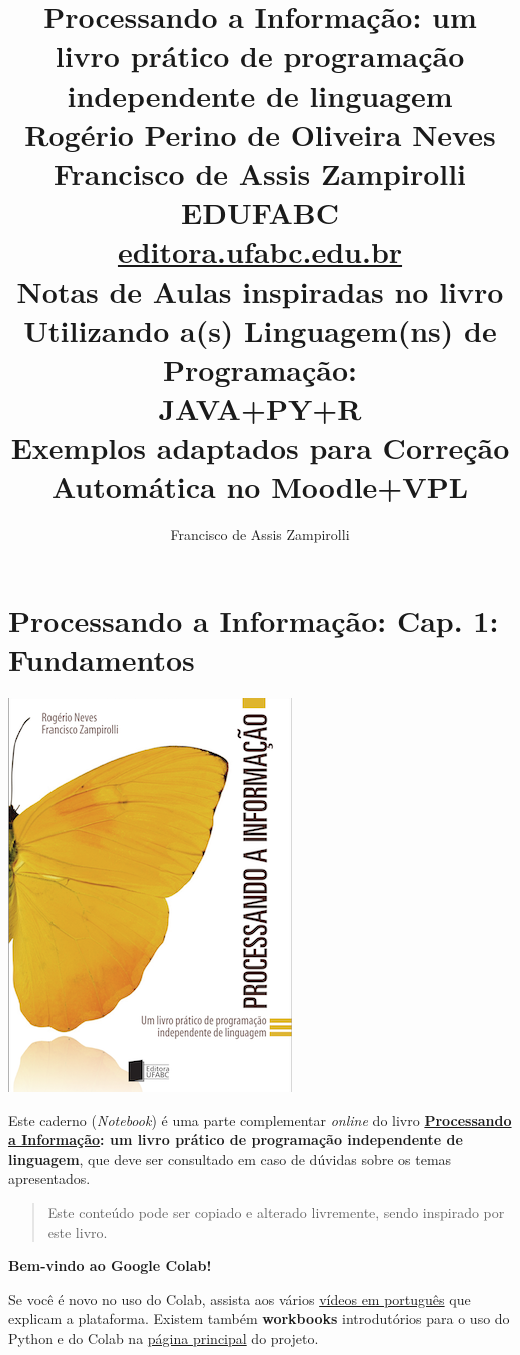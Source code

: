 \documentclass[12pt,a4paper]{article}
\title{Processando a Informação: um livro prático de programação independente de linguagem 
\\\large\vspace{2cm}
Rogério Perino de Oliveira Neves 
\\\vspace{5mm}
Francisco de Assis Zampirolli
\\\large\vspace{2cm}
EDUFABC
\\ \url{editora.ufabc.edu.br}
\\\Huge\vspace{3cm}
Notas de Aulas inspiradas no livro
\\\Large\vspace{1cm}
Utilizando a(s) Linguagem(ns) de Programação: 
\\\Huge\vspace{1cm}
JAVA+PY+R
\\\large\vspace{1cm}
Exemplos adaptados para Correção Automática no Moodle+VPL
\vspace{2cm}}
\author{Francisco de Assis Zampirolli\vspace{1cm}}
\begin{document}
    
    
\clearpage\maketitle
\thispagestyle{empty}
\tableofcontents

    
    

    
    \hypertarget{processando-a-informauxe7uxe3o-cap.-1-fundamentos}{%
\section{Processando a Informação: Cap. 1:
Fundamentos}\label{processando-a-informauxe7uxe3o-cap.-1-fundamentos}}

    \includegraphics{"figs/Capa_Processando_Informacao.jpg"}

Este caderno (\emph{Notebook}) é uma parte complementar \emph{online} do
livro
\textbf{\href{https://editora.ufabc.edu.br/matematica-e-ciencias-da-computacao/58-processando-a-informacao}{Processando
a Informação}: um livro prático de programação independente de
linguagem}, que deve ser consultado em caso de dúvidas sobre os temas
apresentados.

\begin{quote}
Este conteúdo pode ser copiado e alterado livremente, sendo inspirado
por este livro.
\end{quote}

    \textbf{Bem-vindo ao Google Colab!}

Se você é novo no uso do Colab, assista aos vários
\href{https://www.youtube.com/results?search_query=introdu\%C3\%A7\%C3\%A3o+ao+colab}{vídeos
em português} que explicam a plataforma. Existem também
\textbf{workbooks} introdutórios para o uso do Python e do Colab na
\href{https://colab.research.google.com/}{página principal} do projeto.
\end{document}
